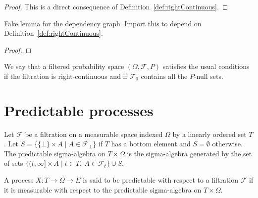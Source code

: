 \begin{proof}\leanok
This is a direct consequence of Definition~\ref{def:rightContinuous}.
\end{proof}

\begin{lemma}\label{lem:rightContinuous_basic}
  \leanok
Fake lemma for the dependency graph. Import this to depend on Definition~\ref{def:rightContinuous}.
\end{lemma}

\begin{proof}\leanok

\end{proof}


\begin{definition}\label{def:hasUsualConditions}
  \leanok
We say that a filtered probability space $(\Omega, \mathcal{F}, P)$ satisfies the usual conditions if the filtration is right-continuous and if $\mathcal{F}_0$ contains all the $P$-null sets.
\end{definition}




\section{Predictable processes}


\begin{definition}\label{def:predictableMeasurableSpace}
  \mathlibok
Let $\mathcal{F}$ be a filtration on a measurable space indexed $\Omega$ by a linearly ordered set $T$.
Let $S = \{\{\bot\} \times A \mid A \in \mathcal{F}_\bot\}$ if $T$ has a bottom element and $S = \emptyset$ otherwise.
The predictable sigma-algebra on $T \times \Omega$ is the sigma-algebra generated by the set of sets $\{(t, \infty] \times A \mid t \in T, \: A \in \mathcal{F}_t\} \cup S$.
\end{definition}


\begin{definition}\label{def:predictable}
  \mathlibok
A process $X : T \to \Omega \to E$ is said to be predictable with respect to a filtration $\mathcal{F}$ if it is measurable with respect to the predictable sigma-algebra on $T \times \Omega$.
\end{definition}


